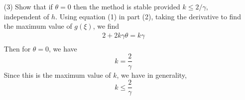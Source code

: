 \documentclass{article}
\begin{document}
\begin{itemize}
    \item[(3)] Show that if $\theta = 0$ then the method is stable provided $k \leq 2/\gamma$, independent of $h$.
    \newline\newline
    Using equation (1) in part (2), taking the derivative to find the maximum value of $g(\xi)$, we find 
    \begin{align*}
        2 + 2k\gamma\theta = k\gamma\\
    \end{align*}
    Then for $\theta = 0$, we have
    \[k = \frac{2}{\gamma}\]
    Since this is the maximum value of $k$, we have in generality,
    \[k \leq \frac{2}{\gamma}\]
    
\end{itemize}
\end{document}

